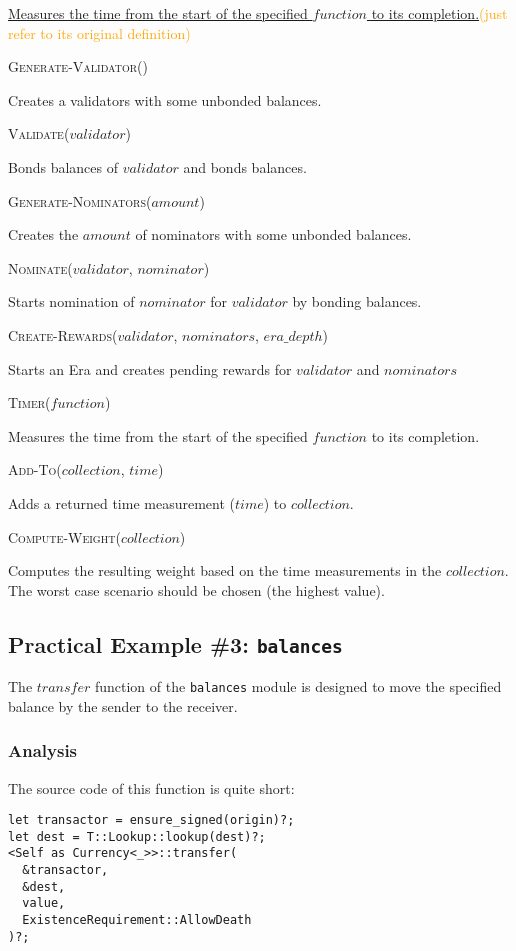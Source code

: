 \documentclass[11pt,a4paper]{article}
\newcommand{\syed}[2]{{\underline{#1}}\textcolor{orange}{(#2)}}
\newcommand{\SubItem}[1]{
    {\setlength\itemindent{15pt} \item[-] #1}
}
\begin{document}
\syed{Measures the time from the start of the specified $function$ to its completion.}{just refer to its original definition}

\begin{itemize}
  \item \textsc{Generate-Validator()}
  \SubItem{Creates a validators with some unbonded balances.}
  \item \textsc{Validate($validator$)}
  \SubItem{Bonds balances of $validator$ and bonds balances.}
  \item \textsc{Generate-Nominators($amount$)}
  \SubItem{Creates the $amount$ of nominators with some unbonded balances.}
  \item \textsc{Nominate($validator$, $nominator$)}
  \SubItem{Starts nomination of $nominator$ for $validator$ by bonding balances.}
  \item \textsc{Create-Rewards($validator$, $nominators$, $era\_depth$)}
  \SubItem{Starts an Era and creates pending rewards for $validator$ and $nominators$}
  \item \textsc{Timer($function$)}
  \SubItem{Measures the time from the start of the specified $function$ to its
  completion.}
  \item \textsc{Add-To($collection$, $time$)}
  \SubItem{Adds a returned time measurement ($time$) to $collection$.}
  \item \textsc{Compute-Weight($collection$)}
  \SubItem{Computes the resulting weight based on the time measurements in the
  $collection$. The worst case scenario should be chosen (the highest value).}
\end{itemize}

\subsection{Practical Example \#3: \texttt{balances}}

The $transfer$ function of the \texttt{balances} module is designed to move the specified balance by the sender to the receiver.

\subsubsection{Analysis}

The source code of this function is quite short:

\begin{verbatim}
let transactor = ensure_signed(origin)?;
let dest = T::Lookup::lookup(dest)?;
<Self as Currency<_>>::transfer(
  &transactor,
  &dest,
  value,
  ExistenceRequirement::AllowDeath
)?;
\end{verbatim}
\end{document}
